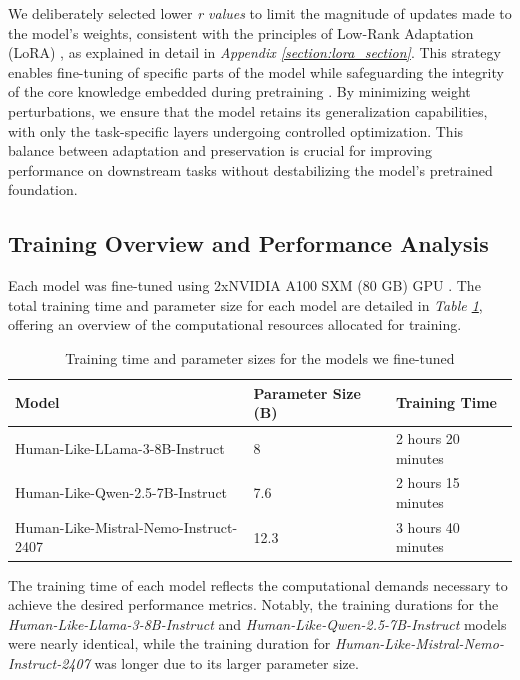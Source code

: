 \documentclass{article}
\begin{document}
We deliberately selected lower \textit{r values} to limit the magnitude of updates made to the model's weights, consistent with the principles of Low-Rank Adaptation (LoRA) \cite{hu2021loralowrankadaptationlarge}, as explained in detail in \textit{Appendix \ref{section:lora_section}}. This strategy enables fine-tuning of specific parts of the model while safeguarding the integrity of the core knowledge embedded during pretraining \cite{ren2024analyzingreducingcatastrophicforgetting}. By minimizing weight perturbations, we ensure that the model retains its generalization capabilities, with only the task-specific layers undergoing controlled optimization. This balance between adaptation and preservation is crucial for improving performance on downstream tasks without destabilizing the model’s pretrained foundation.

\subsection{Training Overview and Performance Analysis}
 
Each model was fine-tuned using 2xNVIDIA A100 SXM (80 GB) GPU \cite{nvidia_a100}. The total training time and parameter size for each model are detailed in \textit{Table \ref{tab:training_time}}, offering an overview of the computational resources allocated for training. 
\begin{table}[h!]
\centering
\begin{tabular}{p{7cm} p{5cm} p{3.2cm}}
\hline
\textbf{Model} & \textbf{Parameter Size (B)} & \textbf{Training Time} \\
\hline
Human-Like-LLama-3-8B-Instruct & 8 & 2 hours 20 minutes \\
Human-Like-Qwen-2.5-7B-Instruct & 7.6 & 2 hours 15 minutes \\
Human-Like-Mistral-Nemo-Instruct-2407 & 12.3 & 3 hours 40 minutes \\
\hline
\end{tabular}
\vspace{0.3cm}
\caption{Training time and parameter sizes for the models we fine-tuned}
\label{tab:training_time}
\end{table}
\vspace{0.3cm}
\begin{minipage}{\textwidth}
The training time of each model reflects the computational demands necessary to achieve the desired performance metrics. Notably, the training durations for the \textit{Human-Like-Llama-3-8B-Instruct} and \textit{Human-Like-Qwen-2.5-7B-Instruct} models were nearly identical, while the training duration for \textit{Human-Like-Mistral-Nemo-Instruct-2407} was longer due to its larger parameter size.    
\end{minipage}
\end{document}

